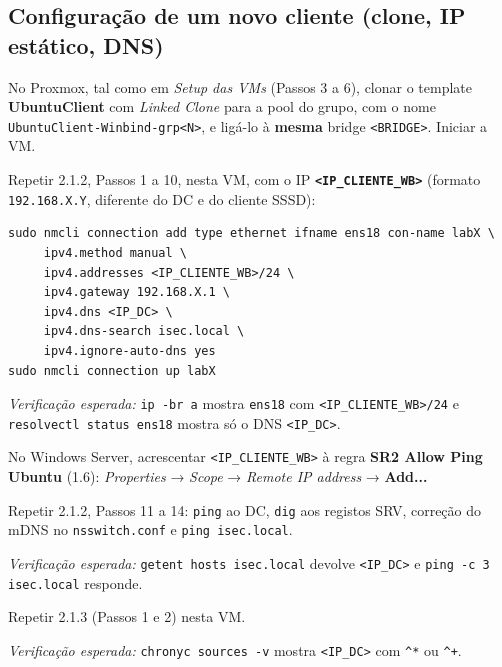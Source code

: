 
\subsection[Configuração de um novo cliente (clone, IP estático, DNS)]{Configuração de um novo cliente (clone, IP estático, DNS)}


No Proxmox, tal como em \emph{Setup das VMs} (Passos 3 a 6), clonar o template \textbf{UbuntuClient} com \emph{Linked Clone} para a pool do grupo, com o nome \texttt{UbuntuClient-Winbind-grp\textless{}N\textgreater{}}, e ligá-lo à \textbf{mesma} bridge \texttt{\textless{}BRIDGE\textgreater{}}. Iniciar a VM.


Repetir 2.1.2, Passos 1 a 10, nesta VM, com o IP \textbf{\texttt{\textless{}IP\_CLIENTE\_WB\textgreater{}}} (formato \texttt{192.168.X.Y}, diferente do DC e do cliente SSSD):

\begin{lstlisting}[style=bashstyle]
sudo nmcli connection add type ethernet ifname ens18 con-name labX \
     ipv4.method manual \
     ipv4.addresses <IP_CLIENTE_WB>/24 \
     ipv4.gateway 192.168.X.1 \
     ipv4.dns <IP_DC> \
     ipv4.dns-search isec.local \
     ipv4.ignore-auto-dns yes
sudo nmcli connection up labX
\end{lstlisting}

\emph{Verificação esperada:} \texttt{ip -br a} mostra \texttt{ens18} com \texttt{\textless{}IP\_CLIENTE\_WB\textgreater{}/\allowbreak{}24} e \texttt{resolvectl status ens18} mostra só o DNS \texttt{\textless{}IP\_DC\textgreater{}}.

No Windows Server, acrescentar \texttt{\textless{}IP\_CLIENTE\_WB\textgreater{}} à regra \textbf{SR2 Allow Ping Ubuntu} (1.6): \emph{Properties} → \emph{Scope} → \emph{Remote IP address} → \textbf{Add...}


Repetir 2.1.2, Passos 11 a 14: \texttt{ping} ao DC, \texttt{dig} aos registos SRV, correção do mDNS no \texttt{nsswitch.conf} e \texttt{ping isec.local}.

\emph{Verificação esperada:} \texttt{getent hosts isec.local} devolve \texttt{\textless{}IP\_DC\textgreater{}} e \texttt{ping -c 3 isec.local} responde.

\passo{Passo 4 - Sincronizar o relógio}

Repetir 2.1.3 (Passos 1 e 2) nesta VM.

\emph{Verificação esperada:} \texttt{chronyc sources -v} mostra \texttt{\textless{}IP\_DC\textgreater{}} com \texttt{\textasciicircum{}*} ou \texttt{\textasciicircum{}+}.

